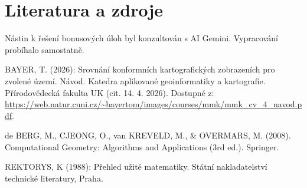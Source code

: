 \section{Literatura a zdroje}
Nástin k řešení bonusových úloh byl konzultován s AI Gemini. Vypracování probíhalo samostatně.

BAYER, T. (2026): Srovnání konformních kartografických zobrazeních pro zvolené území. Návod.
Katedra aplikované geoinformatiky a kartografie. Přírodovědecká fakulta UK (cit. 14. 4. 2026). Dostupné z: \url{https://web.natur.cuni.cz/~bayertom/images/courses/mmk/mmk_cv_4_navod.pdf}.

de BERG, M., CJEONG, O., van KREVELD, M., \& OVERMARS, M. (2008). Computational Geometry: Algorithms and Applications (3rd ed.). Springer.

REKTORYS, K (1988): Přehled užité matematiky. Státní nakladatelství technické literatury, Praha.
